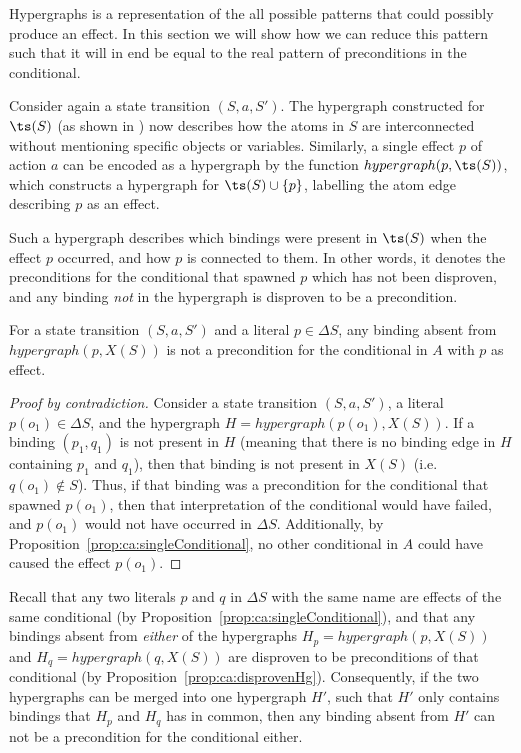 \documentclass[\master/Master.tex]{subfiles}
\begin{document}
Hypergraphs is a representation of the all possible patterns that could possibly produce an effect. In this section we will show how we can reduce this pattern such that it will in end be equal to the real pattern of preconditions in the conditional.

Consider again a state transition $\left( S, a, S' \right)$. The hypergraph constructed for $\ts(S)$ (as shown in ) now describes how the atoms in $S$ are interconnected without mentioning specific objects or variables. Similarly, a single effect $p$ of action $a$ can be encoded as a hypergraph by the function $hypergraph(p,\ts(S))$, which constructs a hypergraph for $\ts(S) \cup \{p\}$, labelling the atom edge describing $p$ as an effect.

Such a hypergraph describes which bindings were present in $\ts(S)$ when the effect $p$ occurred, and how $p$ is connected to them. In other words, it denotes the preconditions for the conditional that spawned $p$ which has not been disproven, and any binding \textit{not} in the hypergraph is disproven to be a precondition.

\begin{proposition}\label{prop:ca:disprovenHg}
    For a state transition $\left( S, a, S' \right)$ and a literal $p \in \Delta S$, any binding absent from $hypergraph \left( p, X(S) \right)$ is not a precondition for the conditional in $A$ with $p$ as effect. 
\end{proposition}

\begin{proof}[Proof by contradiction]
    Consider a state transition $\left( S, a, S' \right)$, a literal $p \left( o_1 \right) \in \Delta S$, and the hypergraph $H = hypergraph\left( p\left(o_1\right), X(S) \right)$. If a binding $(p_1, q_1)$ is not present in $H$ (meaning that there is no binding edge in $H$ containing $p_1$ and $q_1$), then that binding is not present in $X(S)$ (i.e.\ $q\left(o_1\right) \notin S$). Thus, if that binding was a precondition for the conditional that spawned $p\left(o_1\right)$, then that interpretation of the conditional would have failed, and $p\left( o_1 \right)$ would not have occurred in $\Delta S$. Additionally, by Proposition~\ref{prop:ca:singleConditional}, no other conditional in $A$ could have caused the effect $p \left(o_1\right)$.
\end{proof}

Recall that any two literals $p$ and $q$ in $\Delta S$ with the same name are effects of the same conditional (by Proposition~\ref{prop:ca:singleConditional}), and that any bindings absent from \textit{either} of the hypergraphs $H_p = hypergraph(p, X(S))$ and $H_q = hypergraph(q, X(S))$ are disproven to be preconditions of that conditional (by Proposition~\ref{prop:ca:disprovenHg}). Consequently, if the two hypergraphs can be merged into one hypergraph $H'$, such that $H'$ only contains bindings that $H_p$ and $H_q$ has in common, then any binding absent from $H'$ can not be a precondition for the conditional either. 
\end{document}
